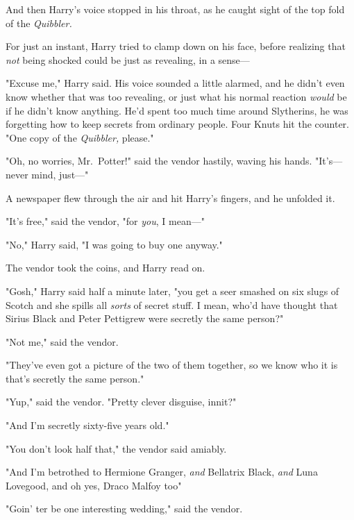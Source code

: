 And then Harry's voice stopped in his throat, as he caught sight of the top
fold of the \emph{Quibbler.}


For just an instant, Harry tried to clamp down on his face, before realizing
that \emph{not} being shocked could be just as revealing, in a sense---

"Excuse me," Harry said. His voice sounded a little alarmed, and he didn't even
know whether that was too revealing, or just what his normal reaction
\emph{would} be if he didn't know anything. He'd spent too much time around
Slytherins, he was forgetting how to keep secrets from ordinary people. Four
Knuts hit the counter. "One copy of the \emph{Quibbler,} please."

"Oh, no worries, Mr.~Potter!" said the vendor hastily, waving his hands.
"It's---never mind, just---"

A newspaper flew through the air and hit Harry's fingers, and he unfolded it.


"It's free," said the vendor, "for \emph{you}, I mean---"

"No," Harry said, "I was going to buy one anyway."

The vendor took the coins, and Harry read on.

"Gosh," Harry said half a minute later, "you get a seer smashed on six slugs of
Scotch and she spills all \emph{sorts} of secret stuff. I mean, who'd have
thought that Sirius Black and Peter Pettigrew were secretly the same person?"

"Not me," said the vendor.

"They've even got a picture of the two of them together, so we know who it is
that's secretly the same person."

"Yup," said the vendor. "Pretty clever disguise, innit?"

"And I'm secretly sixty-five years old."

"You don't look half that," the vendor said amiably.

"And I'm betrothed to Hermione Granger, \emph{and} Bellatrix Black, \emph{and}
Luna Lovegood, and oh yes, Draco Malfoy too{\el}"

"Goin' ter be one interesting wedding," said the vendor.

